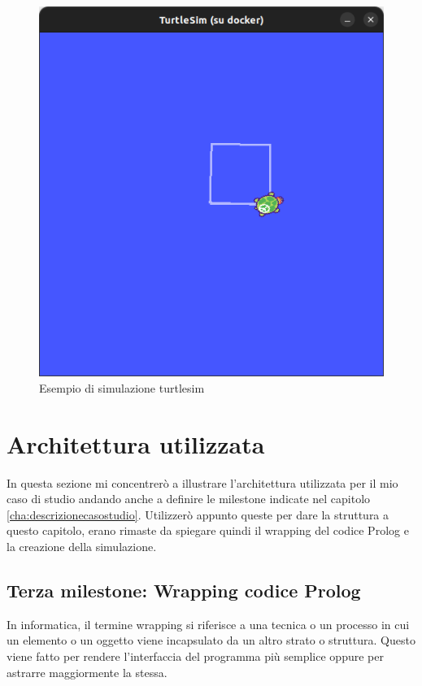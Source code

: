 \begin{figure}[h!]
    \centering
    \includegraphics[scale=0.4]{images/turtlesimes.png}
    \caption{Esempio di simulazione turtlesim}
    \label{fig:turtlesimes}
\end{figure}
\section{Architettura utilizzata}
\label{sec:architettura_utilizzata}
In questa sezione mi concentrerò a illustrare l'architettura utilizzata per il mio caso di studio andando anche a definire le milestone indicate nel capitolo \ref{cha:descrizionecasostudio}.
Utilizzerò appunto queste per dare la struttura a questo capitolo, erano rimaste da spiegare quindi il wrapping del codice Prolog e la creazione della simulazione.

\subsection{Terza milestone: Wrapping codice Prolog}
\label{subsec:wrappping}
In informatica, il termine wrapping si riferisce a una tecnica o un processo in cui un elemento o un oggetto viene incapsulato da un altro strato o struttura.
Questo viene fatto per rendere l'interfaccia del programma più semplice oppure per astrarre maggiormente la stessa. 

